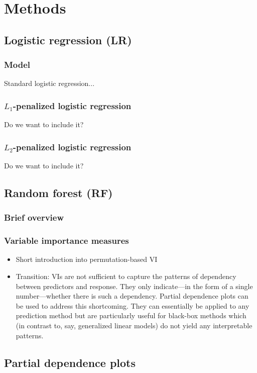 \documentclass[12pt]{article}
\begin{document}
\section{Methods}
\subsection{Logistic regression (LR)}
\subsubsection{Model}
Standard logistic regression...

\subsubsection{$L_1$-penalized logistic regression}
Do we want to include it?

\subsubsection{$L_2$-penalized logistic regression}
Do we want to include it?

\subsection{Random forest (RF)}
\subsubsection{Brief overview}

\subsubsection{Variable importance measures}
\begin{itemize}
\item Short introduction into permutation-based VI
\item Transition: VIs are not sufficient to capture the patterns of dependency between predictors and response. They only indicate---in the form of a single number---whether there is such a dependency. Partial dependence plots can be used to address this shortcoming. They can essentially be applied to any prediction method but are particularly useful for black-box methods which (in contrast to, say, generalized linear models) do not yield any interpretable patterns.
\end{itemize}

\subsection{Partial dependence plots}
\end{document}
